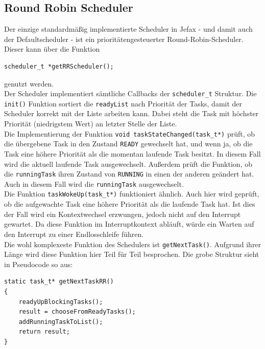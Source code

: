\documentclass[fontsize=12pt, toc=bibliography, notitlepage]{scrreprt}
\begin{document}
\subsection{Round Robin Scheduler}
\label{subsec:round-robin-scheduler}
Der einzige standardmäßig implementierte Scheduler in Jefax - und damit auch der Defaultscheduler - ist ein prioritätengesteuerter Round-Robin-Scheduler. Dieser kann über die Funktion

\begin{lstlisting}
scheduler_t *getRRScheduler();
\end{lstlisting}

genutzt werden.\\

Der Scheduler implementiert sämtliche Callbacks der \lstinline$scheduler_t$ Struktur.
Die \lstinline$init()$ Funktion sortiert die \lstinline$readyList$ nach Priorität der Tasks, damit der Scheduler korrekt mit der Liste arbeiten kann. Dabei steht die Task mit höchster Priorität (niedrigstem Wert) an letzter Stelle der Liste.\\

Die Implementierung der Funktion \lstinline$void taskStateChanged(task_t*)$ prüft, ob die übergebene Task in den Zustand \lstinline$READY$ gewechselt hat, und wenn ja, ob die Task eine höhere Priorität als die momentan laufende Task besitzt. In diesem Fall wird die aktuell laufende Task ausgewechselt. Außerdem prüft die Funktion, ob die \lstinline$runningTask$ ihren Zustand von \lstinline$RUNNING$ in einen der anderen geändert hat. Auch in diesem Fall wird die \lstinline$runningTask$ ausgewechselt.\\

Die Funktion \lstinline$taskWokeUp(task_t*)$ funktioniert ähnlich. Auch hier wird geprüft, ob die aufgewachte Task eine höhere Priorität als die laufende Task hat. Ist dies der Fall wird ein Kontextwechsel erzwungen, jedoch nicht auf den Interrupt gewartet. Da diese Funktion im Interruptkontext abläuft, würde ein Warten auf den Interrupt zu einer Endlosschleife führen.\\

Die wohl komplexeste Funktion des Schedulers ist \lstinline$getNextTask()$. Aufgrund ihrer Länge wird diese Funktion hier Teil für Teil besprochen. Die grobe Struktur sieht in Pseudocode so aus:

\begin{lstlisting}
static task_t* getNextTaskRR()
{
	readyUpBlockingTasks();
	result = chooseFromReadyTasks();
	addRunningTaskToList();
	return result;
}
\end{lstlisting}
\end{document}
